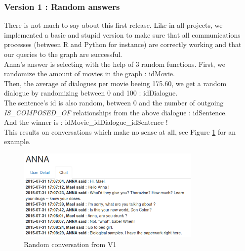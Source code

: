 \subsubsection{Version 1 : Random answers}
\label{sssec:v_rand}
There is not much to say about this first release. Like in all projects, we implemented a basic and stupid version to make sure that all communications processes (between R and Python for instance) are correctly working and that our queries to the graph are successful.\\
Anna's answer is selecting with the help of 3 random functions. First, we randomize the amount of movies in the graph : idMovie.\\
Then, the average of dialogues per movie beeing 175.60, we get a random dialogue by randomizing between 0 and 100 : idDialogue.\\
The sentence's id is also random, between 0 and the number of outgoing \textit{IS\_COMPOSED\_OF} relationships from the above dialogue : idSentence.\\
And the winner is : idMovie\_idDialogue\_idSentence !\\
This results on conversations which make no sense at all, see Figure \ref{fig:convRandom} for an example.\\
\begin{figure}[!h]
\begin{center}
\includegraphics[width=0.80\textwidth]{./img/convRandom.png}
\end{center}
\caption{Random conversation from V1}
\label{fig:convRandom}
\end{figure}

